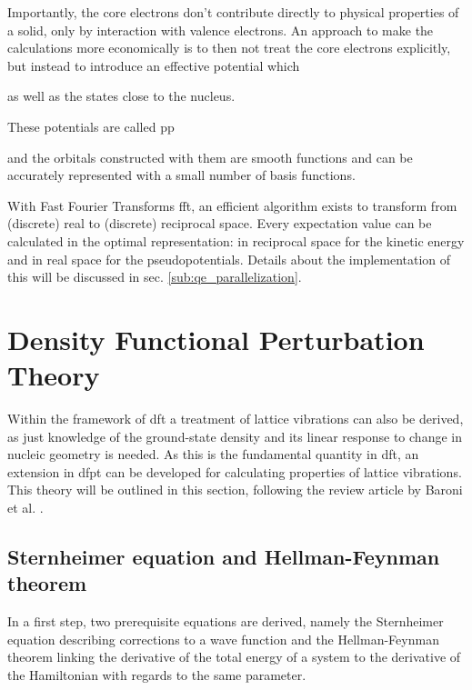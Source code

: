 \documentclass[main.tex]{subfiles}
\begin{document}
Importantly, the core electrons don't contribute directly to physical properties of a solid, only by interaction with valence electrons.
An approach to make the calculations more economically is to then not treat the core electrons explicitly, but instead to introduce an effective potential which 

as well as the states close to the nucleus.

These potentials are called \acrfull{pp} 

and the orbitals constructed with them are smooth functions and can be accurately represented with a small number of basis functions.

With Fast Fourier Transforms \gls{fft}, an efficient algorithm exists to transform from (discrete) real to (discrete) reciprocal space.
Every expectation value can be calculated in the optimal representation: in reciprocal space for the kinetic energy and in real space for the pseudopotentials.
Details about the implementation of this will be discussed in sec. \ref{sub:qe_parallelization}.

\section{Density Functional Perturbation Theory}\label{sec:theory_dfpt}

Within the framework of \acrshort{dft} a treatment of lattice vibrations can also be derived, as just knowledge of the ground-state density and its linear response to change in nucleic geometry is needed.
As this is the fundamental quantity in \acrshort{dft}, an extension in \acrshort{dfpt} can be developed for calculating properties of lattice vibrations.
This theory will be outlined in this section, following the review article by Baroni et al. \cite{baroni_phonons_2001}.

\subsection{Sternheimer equation and Hellman-Feynman theorem}

In a first step, two prerequisite equations are derived, namely the Sternheimer equation describing corrections to a wave function and the Hellman-Feynman theorem linking the derivative of the total energy of a system to the derivative of the Hamiltonian with regards to the same parameter.
\end{document}
